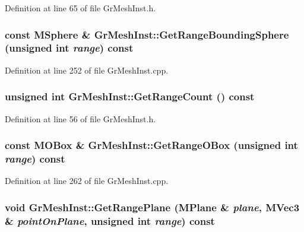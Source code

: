 Definition at line 65 of file GrMeshInst.h.\hypertarget{class_gr_mesh_inst_e5687fcc93bae7444ae3d2be48ca5dea}{
\subsubsection[{GetRangeBoundingSphere}]{\setlength{\rightskip}{0pt plus 5cm}const {\bf MSphere} \& GrMeshInst::GetRangeBoundingSphere (unsigned int {\em range}) const}}
\label{class_gr_mesh_inst_e5687fcc93bae7444ae3d2be48ca5dea}




Definition at line 252 of file GrMeshInst.cpp.\hypertarget{class_gr_mesh_inst_cbd495c05b5c83745059b6d842470607}{
\subsubsection[{GetRangeCount}]{\setlength{\rightskip}{0pt plus 5cm}unsigned int GrMeshInst::GetRangeCount () const}}
\label{class_gr_mesh_inst_cbd495c05b5c83745059b6d842470607}




Definition at line 56 of file GrMeshInst.h.\hypertarget{class_gr_mesh_inst_13b6763be580263b74c247723329d226}{
\subsubsection[{GetRangeOBox}]{\setlength{\rightskip}{0pt plus 5cm}const {\bf MOBox} \& GrMeshInst::GetRangeOBox (unsigned int {\em range}) const}}
\label{class_gr_mesh_inst_13b6763be580263b74c247723329d226}




Definition at line 262 of file GrMeshInst.cpp.\hypertarget{class_gr_mesh_inst_338043d8bfbf7e611c6770bacc83cb2a}{
\subsubsection[{GetRangePlane}]{\setlength{\rightskip}{0pt plus 5cm}void GrMeshInst::GetRangePlane ({\bf MPlane} \& {\em plane}, \/  {\bf MVec3} \& {\em pointOnPlane}, \/  unsigned int {\em range}) const}}
\label{class_gr_mesh_inst_338043d8bfbf7e611c6770bacc83cb2a}




